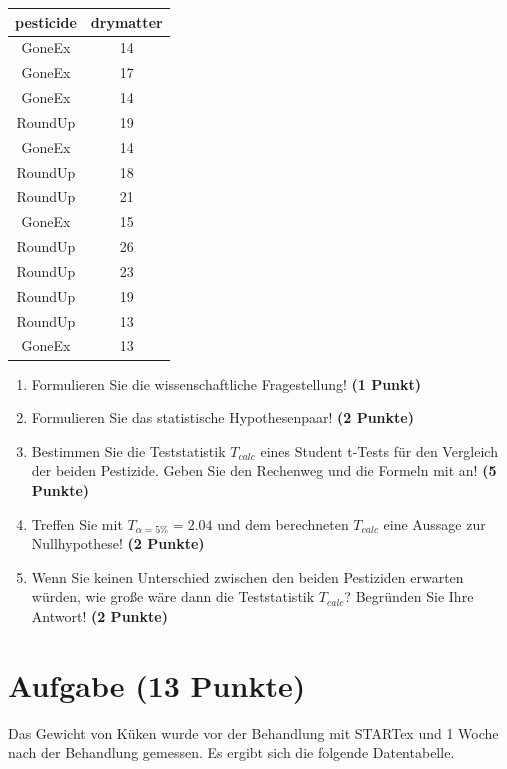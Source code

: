\documentclass[a4paper, 10pt]{scrartcl}\usepackage[]{graphicx}\usepackage[]{color}
\begin{document}
\begin{table}[!h]
\centering
\begin{tabular}{cc}
\toprule
pesticide & drymatter\\
\midrule
GoneEx & 14\\
GoneEx & 17\\
GoneEx & 14\\
RoundUp & 19\\
GoneEx & 14\\
\addlinespace
RoundUp & 18\\
RoundUp & 21\\
GoneEx & 15\\
RoundUp & 26\\
RoundUp & 23\\
\addlinespace
RoundUp & 19\\
RoundUp & 13\\
GoneEx & 13\\
\bottomrule
\end{tabular}
\end{table}



\begin{enumerate}
  \item Formulieren Sie die wissenschaftliche Fragestellung! \textbf{(1 Punkt)}
  \item Formulieren Sie das statistische Hypothesenpaar! \textbf{(2
      Punkte)}
  \item Bestimmen Sie die Teststatistik $T_{calc}$ eines Student t-Tests für den
  Vergleich der beiden Pestizide. Geben Sie den Rechenweg und die Formeln
  mit an! \textbf{(5 Punkte)}
\item Treffen Sie mit $T_{\alpha = 5\%} = 2.04$ und dem berechneten $T_{calc}$ eine Aussage
  zur Nullhypothese! \textbf{(2 Punkte)}
\item Wenn Sie keinen Unterschied zwischen den beiden Pestiziden erwarten
  w{\"u}rden, wie gro{\ss}e w{\"a}re dann die Teststatistik $T_{calc}$? Begründen Sie Ihre
  Antwort! \textbf{(2 Punkte)}
\end{enumerate} 
\clearpage

\section{Aufgabe \hfill (13 Punkte)}

Das Gewicht von K{\"u}ken wurde vor der Behandlung mit STARTex und 1 Woche nach
der Behandlung gemessen. Es ergibt sich die folgende Datentabelle.
\end{document}
